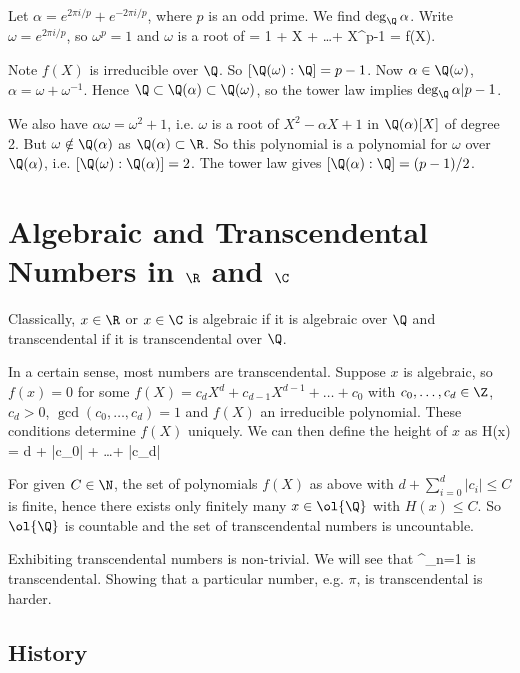 \begin{example}
Let $\alpha  = e^{2\pi i/p} + e^{-2\pi i/p}$, where $p$ is an odd prime. We find $\deg_\Q \alpha$. Write $\omega = e^{2\pi i/p}$, so $\omega^p = 1$ and $\omega$ is a root of
\be
{} = 1 + X + \dots+ X^{p-1} = f(X).
\ee

Note $f(X)$ is irreducible over $\Q$. So $[\Q(\omega) : \Q] = p - 1$. Now $\alpha \in \Q(\omega)$, $\alpha  = \omega + \omega^{-1}$. Hence $\Q \subset \Q(\alpha ) \subset \Q(\omega)$, so the tower law implies $\deg_\Q \alpha  | p - 1$.

We also have $\alpha \omega = \omega^2 + 1$, i.e. $\omega$ is a root of $X^2 - \alpha X + 1$ in $\Q(\alpha )[X]$ of degree 2. But $\omega \notin\Q(\alpha )$ as $\Q(\alpha ) \subset \R$. So this polynomial is a polynomial for $\omega$ over $\Q(\alpha )$, i.e. $[\Q(\omega) : \Q(\alpha )] = 2$. The tower law gives $[\Q(\alpha ) : \Q] = (p - 1)/2$.
\end{example}


\section{Algebraic and Transcendental Numbers in $\R$ and $\C$}

Classically, $x \in \R$ or $x \in \C$ is algebraic if it is algebraic over $\Q$ and transcendental if it is transcendental over $\Q$.

In a certain sense, most numbers are transcendental. Suppose $x$ is algebraic, so $f(x) = 0$ for some $f(X) = c_dX^d+c_{d-1}X^{d-1}+\dots +c_0$ with $c_0, \dots , c_d \in\Z$, $c_d > 0$, $\gcd(c_0, \dots , c_d) = 1$ and $f(X)$ an irreducible polynomial. These conditions determine $f(X)$ uniquely. We can then define the height of $x$ as
\be
H(x) = d + |c_0| + \dots+ |c_d| \in\N
\ee

For given $C \in \N$, the set of polynomials $f(X)$ as above with $d + \sum^d_{i=0} |c_i| \leq C$ is finite, hence there exists only finitely many $x \in \ol{\Q}$ with $H(x) \leq  C$. So $\ol{\Q}$ is countable and the set of transcendental numbers is uncountable.

Exhibiting transcendental numbers is non-trivial. We will see that
\be
\sum^\infty_{n=1} 
\ee
is transcendental. Showing that a particular number, e.g. $\pi$, is transcendental is harder.


\subsection{History}

